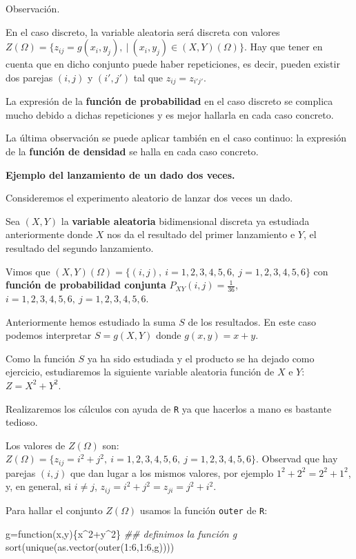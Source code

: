 \documentclass[
  letterpaper,
  DIV=11,
  numbers=noendperiod]{scrreprt}
\newenvironment{Shaded}{\begin{snugshade}}{\end{snugshade}}
\newcommand{\ControlFlowTok}[1]{\textcolor[rgb]{0.00,0.23,0.31}{#1}}
\newcommand{\DecValTok}[1]{\textcolor[rgb]{0.68,0.00,0.00}{#1}}
\newcommand{\DocumentationTok}[1]{\textcolor[rgb]{0.37,0.37,0.37}{\textit{#1}}}
\newcommand{\FunctionTok}[1]{\textcolor[rgb]{0.28,0.35,0.67}{#1}}
\newcommand{\NormalTok}[1]{\textcolor[rgb]{0.00,0.23,0.31}{#1}}
\newcommand{\OtherTok}[1]{\textcolor[rgb]{0.00,0.23,0.31}{#1}}
\newcommand{\SpecialCharTok}[1]{\textcolor[rgb]{0.37,0.37,0.37}{#1}}
\begin{document}
Observación.

En el caso discreto, la variable aleatoria será discreta con valores
\(Z(\Omega)=\{z_{ij}=g(x_i,y_j),\ |\ (x_i,y_j)\in (X,Y)(\Omega)\}\). Hay
que tener en cuenta que en dicho conjunto puede haber repeticiones, es
decir, pueden existir dos parejas \((i,j)\) y \((i',j')\) tal que
\(z_{ij}=z_{i'j'}\).

La expresión de la \textbf{función de probabilidad} en el caso discreto
se complica mucho debido a dichas repeticiones y es mejor hallarla en
cada caso concreto.

La última observación se puede aplicar también en el caso continuo: la
expresión de la \textbf{función de densidad} se halla en cada caso
concreto.

\textbf{Ejemplo del lanzamiento de un dado dos veces.}

Consideremos el experimento aleatorio de lanzar dos veces un dado.

Sea \((X,Y)\) la \textbf{variable aleatoria} bidimensional discreta ya
estudiada anteriormente donde \(X\) nos da el resultado del primer
lanzamiento e \(Y\), el resultado del segundo lanzamiento.

Vimos que \((X,Y)(\Omega)=\{(i,j),\ i=1,2,3,4,5,6,\ j=1,2,3,4,5,6\}\)
con \textbf{función de probabilidad conjunta}
\(P_{XY}(i,j)=\frac{1}{36}\), \(i=1,2,3,4,5,6,\ j=1,2,3,4,5,6.\)

Anteriormente hemos estudiado la suma \(S\) de los resultados. En este
caso podemos interpretar \(S=g(X,Y)\) donde \(g(x,y)=x+y\).

Como la función \(S\) ya ha sido estudiada y el producto se ha dejado
como ejercicio, estudiaremos la siguiente variable aleatoria función de
\(X\) e \(Y\): \(Z=X^2+Y^2\).

Realizaremos los cálculos con ayuda de \texttt{R} ya que hacerlos a mano
es bastante tedioso.

Los valores de \(Z(\Omega)\) son:
\(Z(\Omega)=\{z_{ij}=i^2+j^2,\ i=1,2,3,4,5,6,\ j=1,2,3,4,5,6\}\).
Observad que hay parejas \((i,j)\) que dan lugar a los mismos valores,
por ejemplo \(1^2+2^2 = 2^2+1^2\), y, en general, si \(i\neq j\),
\(z_{ij}=i^2+j^2=z_{ji}=j^2+i^2\).

Para hallar el conjunto \(Z(\Omega)\) usamos la función \texttt{outer}
de \texttt{R}:

\begin{Shaded}
\begin{Highlighting}[]
\NormalTok{g}\OtherTok{=}\ControlFlowTok{function}\NormalTok{(x,y)\{x}\SpecialCharTok{\^{}}\DecValTok{2}\SpecialCharTok{+}\NormalTok{y}\SpecialCharTok{\^{}}\DecValTok{2}\NormalTok{\}  }\DocumentationTok{\#\# definimos la función g}
\FunctionTok{sort}\NormalTok{(}\FunctionTok{unique}\NormalTok{(}\FunctionTok{as.vector}\NormalTok{(}\FunctionTok{outer}\NormalTok{(}\DecValTok{1}\SpecialCharTok{:}\DecValTok{6}\NormalTok{,}\DecValTok{1}\SpecialCharTok{:}\DecValTok{6}\NormalTok{,g))))}
\end{Highlighting}
\end{Shaded}
\end{document}
